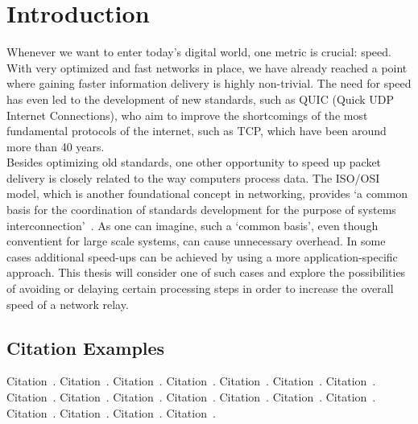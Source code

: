 
\chapter{Introduction}\label{chapter:introduction}

Whenever we want to enter today's digital world, one metric is crucial: speed.
With very optimized and fast networks in place, we have already reached a point where gaining faster information
delivery is highly non-trivial.
The need for speed has even led to the development of new standards, such as QUIC (Quick UDP Internet Connections), 
who aim to improve the shortcomings of the most fundamental protocols of the internet, such as TCP, which have been 
around more than 40 years. 
\\
Besides optimizing old standards, one other opportunity to speed up packet delivery is closely related to the way 
computers process data.
The ISO/OSI model, which is another foundational concept in networking, provides `a common basis for the coordination 
of standards development for the purpose of systems interconnection'~\parencite{iso-osi-standard}.
As one can imagine, such a `common basis', even though conventient for large scale systems, can cause unnecessary
overhead.
In some cases additional speed-ups can be achieved by using a more application-specific approach.
This thesis will consider one of such cases and explore the possibilities of avoiding or delaying certain processing
steps in order to increase the overall speed of a network relay.







\section{Citation Examples}
Citation~\parencite{rfc-9000}.
Citation~\parencite{iso-osi-standard}.
Citation~\parencite{draft-moqtransport}.
Citation~\parencite{article-quic-usage}.
Citation~\parencite{internet-quic-usage}.
Citation~\parencite{facebook-quic-usage}.
Citation~\parencite{google-quic-usage}.
Citation~\parencite{quic-nic-offload}.
Citation~\parencite{quic-explained}.
Citation~\parencite{equic-gateway}.
Citation~\parencite{media-streaming-prio-drop}.
Citation~\parencite{quic-nic-offload-patent}.
Citation~\parencite{kernel-bypass-msc-thesis}.
Citation~\parencite{quic-go-repo}.
Citation~\parencite{quic-go-prio-packs-repo}.
Citation~\parencite{adaptive-moq-repo}.
Citation~\parencite{priority-moqtransport-repo}.
Citation~\parencite{fast-relays-thesis-repo}.